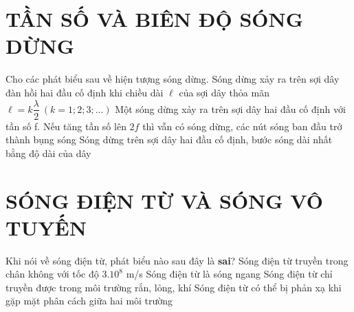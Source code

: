 \section{TẦN SỐ VÀ BIÊN ĐỘ SÓNG DỪNG}
\begin{ex}%
Cho các phát biểu sau về hiện tượng sóng dừng.
{Sóng dừng xảy ra trên sợi dây đàn hồi hai đầu cố định khi chiều dài $\ell$ của sợi dây thỏa mãn $\ell=k \dfrac{\lambda}{2} \ (k=1; 2; 3; \ldots)$}
{Một sóng dừng xảy ra trên sợi dây hai đầu cố định với tần số f. Nếu tăng tần số lên $2 f$ thì vẫn có sóng dừng, các nút sóng ban đầu trở thành bụng sóng}
{Sóng dừng trên sợi dây hai đầu cố định, bước sóng dài nhất bằng độ dài của dây}
\end{ex} 









\section{SÓNG ĐIỆN TỪ VÀ SÓNG VÔ TUYẾN}
\begin{ex}%
Khi nói về sóng điện từ, phát biểu nào sau đây là \textbf{sai}?
\choice
{Sóng điện từ truyền trong chân không với tốc độ $3.10^8$ m/s}
{Sóng điện từ là sóng ngang}
{\True Sóng điện từ chỉ truyền được trong môi trường rắn, lỏng, khí}
{Sóng điện từ có thể bị phản xạ khi gặp mặt phân cách giữa hai môi trường}
\end{ex} 

